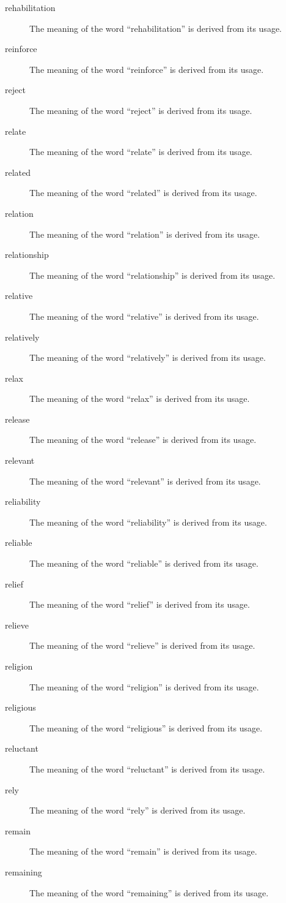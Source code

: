 \documentclass[12pt, letterpaper]{memoir}
\begin{document}
\begin{description}
\item[rehabilitation] The meaning of the word ``rehabilitation'' is derived from its usage.
\item[reinforce] The meaning of the word ``reinforce'' is derived from its usage.
\item[reject] The meaning of the word ``reject'' is derived from its usage.
\item[relate] The meaning of the word ``relate'' is derived from its usage.
\item[related] The meaning of the word ``related'' is derived from its usage.
\item[relation] The meaning of the word ``relation'' is derived from its usage.
\item[relationship] The meaning of the word ``relationship'' is derived from its usage.
\item[relative] The meaning of the word ``relative'' is derived from its usage.
\item[relatively] The meaning of the word ``relatively'' is derived from its usage.
\item[relax] The meaning of the word ``relax'' is derived from its usage.
\item[release] The meaning of the word ``release'' is derived from its usage.
\item[relevant] The meaning of the word ``relevant'' is derived from its usage.
\item[reliability] The meaning of the word ``reliability'' is derived from its usage.
\item[reliable] The meaning of the word ``reliable'' is derived from its usage.
\item[relief] The meaning of the word ``relief'' is derived from its usage.
\item[relieve] The meaning of the word ``relieve'' is derived from its usage.
\item[religion] The meaning of the word ``religion'' is derived from its usage.
\item[religious] The meaning of the word ``religious'' is derived from its usage.
\item[reluctant] The meaning of the word ``reluctant'' is derived from its usage.
\item[rely] The meaning of the word ``rely'' is derived from its usage.
\item[remain] The meaning of the word ``remain'' is derived from its usage.
\item[remaining] The meaning of the word ``remaining'' is derived from its usage.

\end{description}
\end{document}
